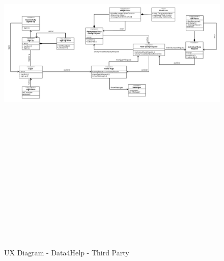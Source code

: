  \begin{figure}[H]
    \includegraphics[width=\linewidth, height = 20cm, keepaspectratio]{./Images/DD_UXD_D4H_TP.png}
    \centering
    \caption{UX Diagram - Data4Help - Third Party}
    \label{fig:sab}
 \end{figure}

